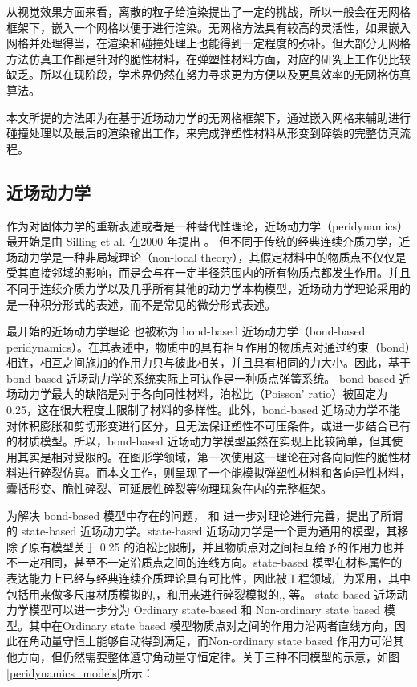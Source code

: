 从视觉效果方面来看，离散的粒子给渲染提出了一定的挑战，所以一般会在无网格框架下，嵌入一个网格以便于进行渲染。无网格方法具有较高的灵活性，如果嵌入网格并处理得当，在渲染和碰撞处理上也能得到一定程度的弥补。但大部分无网格方法仿真工作都是针对的脆性材料，在弹塑性材料方面，对应的研究上工作仍比较缺乏。所以在现阶段，学术界仍然在努力寻求更为方便以及更具效率的无网格仿真算法。

本文所提的方法即为在基于近场动力学的无网格框架下，通过嵌入网格来辅助进行碰撞处理以及最后的渲染输出工作，来完成弹塑性材料从形变到碎裂的完整仿真流程。

\subsection{近场动力学}
\label{pdm_history}

作为对固体力学的重新表述或者是一种替代性理论，近场动力学（peridynamics）最开始是由 Silling et al. 在2000 年提出 。 但不同于传统的经典连续介质力学，近场动力学是一种非局域理论（non-local theory），其假定材料中的物质点不仅仅是受其直接邻域的影响，而是会与在一定半径范围内的所有物质点都发生作用。并且不同于连续介质力学以及几乎所有其他的动力学本构模型，近场动力学理论采用的是一种积分形式的表述，而不是常见的微分形式表述。

最开始的近场动力学理论 也被称为 bond-based 近场动力学（bond-based peridynamics）。在其表述中，物质中的具有相互作用的物质点对通过约束（bond）相连，相互之间施加的作用力只与彼此相关，并且具有相同的力大小。因此，基于 bond-based 近场动力学的系统实际上可认作是一种质点弹簧系统。 bond-based 近场动力学最大的缺陷是对于各向同性材料，泊松比（Poisson' ratio）被固定为 0.25，这在很大程度上限制了材料的多样性。此外，bond-based 近场动力学不能对体积膨胀和剪切形变进行区分，且无法保证塑性不可压条件，或进一步结合已有的材质模型。所以，bond-based 近场动力学模型虽然在实现上比较简单，但其使用其实是相对受限的。在图形学领域，第一次使用这一理论在对各向同性的脆性材料进行碎裂仿真。而本文工作，则呈现了一个能模拟弹塑性材料和各向异性材料，囊括形变、脆性碎裂、可延展性碎裂等物理现象在内的完整框架。

为解决 bond-based 模型中存在的问题， 和 进一步对理论进行完善，提出了所谓的 state-based 近场动力学。state-based 近场动力学是一个更为通用的模型，其移除了原有模型关于 0.25 的泊松比限制，并且物质点对之间相互给予的作用力也并不一定相同，甚至不一定沿质点之间的连线方向。state-based 模型在材料属性的表达能力上已经与经典连续介质理论具有可比性，因此被工程领域广为采用，其中包括用来做多尺度材质模拟的,，和用来进行碎裂模拟的,, 等。
state-based 近场动力学模型可以进一步分为 Ordinary state-based 和 Non-ordinary state based 模型。其中在Ordinary state based 模型物质点对之间的作用力沿两者直线方向，因此在角动量守恒上能够自动得到满足，而Non-ordinary state based 作用力可沿其他方向，但仍然需要整体遵守角动量守恒定律。关于三种不同模型的示意，如图\ref{peridynamics_models}所示：

